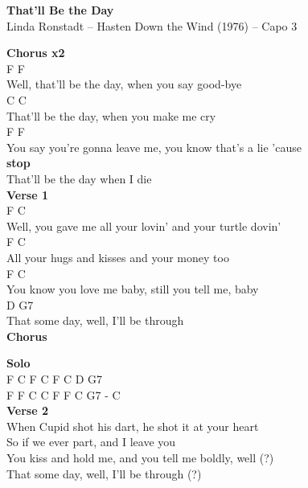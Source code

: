 \documentclass[a4paper]{article}
\begin{document}
    \begin{center}
        \textbf{That'll Be the Day}
        ~\\
        Linda Ronstadt -- Hasten Down the Wind (1976)
         -- Capo 3
    \end{center}
    {
        \scriptsize
        \textbf{Chorus x2}
        ~\\
        {
            \cutive
            \obeyspaces
      F                        F
\\
Well, that'll be the day, when you say good-bye
\\
C                        C
\\
That'll be the day, when you make me cry
\\
    F                              F
\\
You say you're gonna leave me, you know that's a lie 'cause
\\

        }
        \textbf{stop}
        ~\\
        {
            \cutive
            \obeyspaces
That'll be the day       when I die
\\

        }
        \textbf{Verse 1}
        ~\\
        {
            \cutive
            \obeyspaces
          F                               C
\\
Well, you gave me all your lovin' and your turtle dovin'
\\
F                                C
\\
All your hugs and kisses and your money too
\\
F                           C
\\
  You know you love me baby, still you tell me, baby
\\
D                   G7
\\
That some day, well, I'll be through
\\

        }
        \textbf{Chorus}
        ~\\
        {
            \cutive
            \obeyspaces

        }
        \textbf{Solo}
        ~\\
        {
            \cutive
            \obeyspaces
F  C  F  C   F  C  D G7
\\
F  F  C  C   F  F  C  G7 - C
\\

        }
        \textbf{Verse 2}
        ~\\
        {
            \cutive
            \obeyspaces
When Cupid shot his dart, he shot it at your heart
\\
So if we ever part, and I leave you
\\
You kiss and hold me, and you tell me boldly, well (?)
\\
That some day, well, I'll be through (?)
\\

}}
\end{document}
